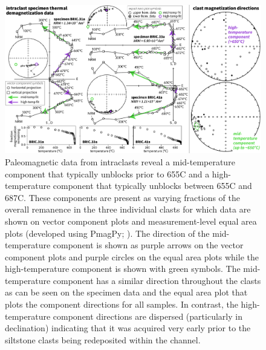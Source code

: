 \documentclass[11pt,letterpaper]{article}
\begin{document}
\begin{figure}[!ht]
\noindent\includegraphics[width=\textwidth]{BRIC_pmag.pdf}
\caption{\small{Paleomagnetic data from intraclasts reveal a mid-temperature component that typically unblocks prior to 655\textdegree C and a high-temperature component that typically unblocks between 655\textdegree C and 687\textdegree C. These components are present as varying fractions of the overall remanence in the three individual clasts for which data are shown on vector component plots and measurement-level equal area plots (developed using PmagPy; \citealp{Tauxe2016a}). The direction of the mid-temperature component is shown as purple arrows on the vector component plots and purple circles on the equal area plots while the high-temperature component is shown with green symbols. The mid-temperature component has a similar direction throughout the clasts as can be seen on the specimen data and the equal area plot that plots the component directions for all samples. In contrast, the high-temperature component directions are dispersed (particularly in declination) indicating that it was acquired very early prior to the siltstone clasts being redeposited within the channel.}}
\label{fig:intraclast_pmag}
\end{figure}
\end{document}
